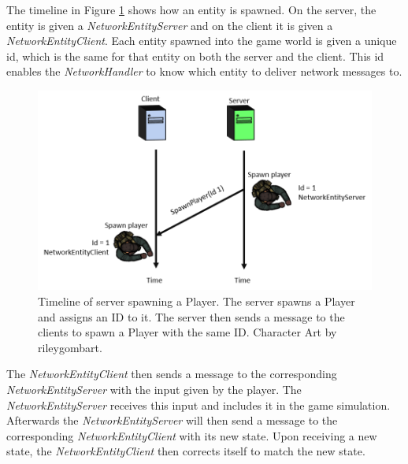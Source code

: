 The timeline in Figure \ref{fig:clientServerEntities} shows how an entity is spawned.
On the server, the entity is given a \emph{NetworkEntityServer} and on the client it is given a \emph{NetworkEntityClient}.
Each entity spawned into the game world is given a unique id, which is the same for that entity on both the server and the client.
This id enables the \emph{NetworkHandler} to know which entity to deliver network messages to.

\begin{figure}[H]
\centering
\includegraphics[scale=1]{figures/network/clientServerEntities}
\caption{Timeline of server spawning a Player. The server spawns a Player and assigns an ID to it. The server then sends a message to the clients to spawn a Player with the same ID. Character Art by rileygombart\cite{artist}.}
\label{fig:clientServerEntities}
\end{figure}

The \emph{NetworkEntityClient} then sends a message to the corresponding \emph{NetworkEntityServer} with the input given by the player.
The \emph{NetworkEntityServer} receives this input and includes it in the game simulation.
Afterwards the \emph{NetworkEntityServer} will then send a message to the corresponding \emph{NetworkEntityClient} with its new state.
Upon receiving a new state, the \emph{NetworkEntityClient} then corrects itself to match the new state.
